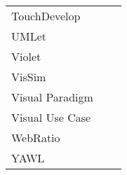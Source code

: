 \begin{tabularx}{\textwidth}{@{}llX@{}}
  TouchDevelop \\ %
  UMLet \\ %
  Violet \\ %
  VisSim \\ %
  Visual Paradigm \\ %
  Visual Use Case \\ %
  WebRatio \\ %
  YAWL \\ %
\end{tabularx}
